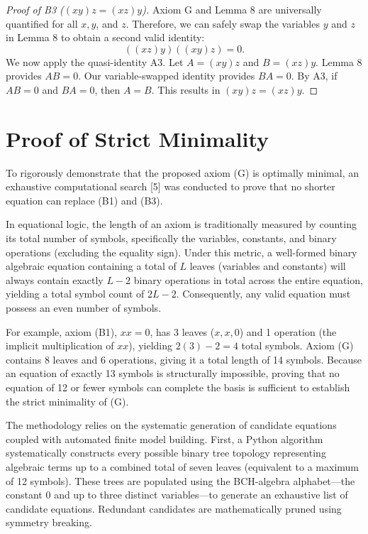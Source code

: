\documentclass[11pt, a4paper]{article}
\begin{document}
\begin{proof}[Proof of B3 ($(xy)z = (xz)y$)]
Axiom G and Lemma 8 are universally quantified for all $x, y$, and $z$. Therefore, we can safely swap the variables $y$ and $z$ in Lemma 8 to obtain a second valid identity:
\[ ((xz)y)((xy)z) = 0. \]
We now apply the quasi-identity A3. Let $A = (xy)z$ and $B = (xz)y$. Lemma 8 provides $AB = 0$. Our variable-swapped identity provides $BA = 0$. By A3, if $AB = 0$ and $BA = 0$, then $A = B$. This results in $(xy)z = (xz)y$.
\end{proof}

\section{Proof of Strict Minimality}
To rigorously demonstrate that the proposed axiom (G) is optimally minimal, an exhaustive computational search [5] was conducted to prove that no shorter equation can replace (B1) and (B3).

In equational logic, the length of an axiom is traditionally measured by counting its total number of symbols, specifically the variables, constants, and binary operations (excluding the equality sign). Under this metric, a well-formed binary algebraic equation containing a total of $L$ leaves (variables and constants) will always contain exactly $L - 2$ binary operations in total across the entire equation, yielding a total symbol count of $2L - 2$. Consequently, any valid equation must possess an even number of symbols.

For example, axiom (B1), $xx = 0$, has 3 leaves ($x, x, 0$) and 1 operation (the implicit multiplication of $xx$), yielding $2(3) - 2 = 4$ total symbols. Axiom (G) contains 8 leaves and 6 operations, giving it a total length of 14 symbols. Because an equation of exactly 13 symbols is structurally impossible, proving that no equation of 12 or fewer symbols can complete the basis is sufficient to establish the strict minimality of (G).

The methodology relies on the systematic generation of candidate equations coupled with automated finite model building. First, a Python algorithm systematically constructs every possible binary tree topology representing algebraic terms up to a combined total of seven leaves (equivalent to a maximum of 12 symbols). These trees are populated using the BCH-algebra alphabet—the constant $0$ and up to three distinct variables—to generate an exhaustive list of candidate equations. Redundant candidates are mathematically pruned using symmetry breaking.
\end{document}
